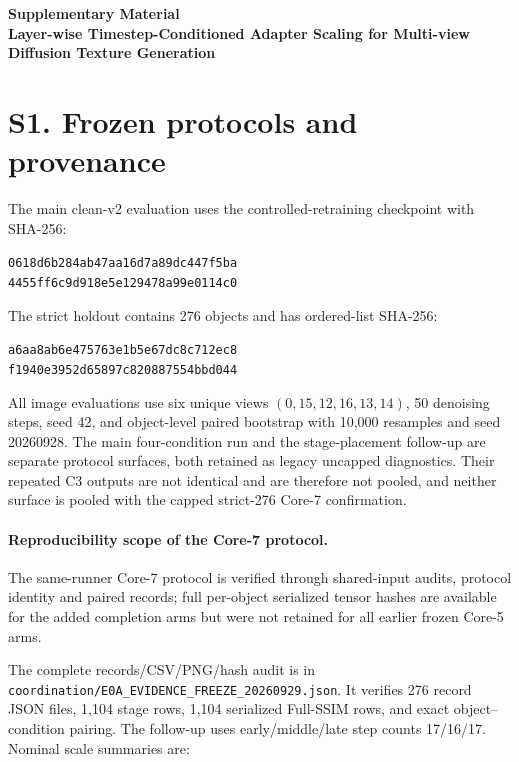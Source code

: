 \documentclass[10pt]{article}
\begin{document}
\begin{center}
{\Large\bfseries Supplementary Material}\\[4pt]
 {\large\bfseries Layer-wise Timestep-Conditioned Adapter Scaling for Multi-view Diffusion Texture Generation}
\end{center}

\section{S1. Frozen protocols and provenance}

The main clean-v2 evaluation uses the controlled-retraining checkpoint with
SHA-256:
\begin{center}
\texttt{0618d6b284ab47aa16d7a89dc447f5ba}\\
\texttt{4455ff6c9d918e5e129478a99e0114c0}
\end{center}
The strict holdout contains 276 objects and has ordered-list SHA-256:
\begin{center}
\texttt{a6aa8ab6e475763e1b5e67dc8c712ec8}\\
\texttt{f1940e3952d65897c820887554bbd044}
\end{center}
All image evaluations use six unique views $(0,15,12,16,13,14)$, 50
denoising steps, seed 42, and object-level paired bootstrap with 10,000
resamples and seed 20260928. The main four-condition run and the
stage-placement follow-up are separate protocol surfaces, both retained as
legacy uncapped diagnostics. Their repeated C3 outputs are not identical and
are therefore not pooled, and neither surface is pooled with the capped
strict-276 Core-7 confirmation.

\paragraph{Reproducibility scope of the Core-7 protocol.} The same-runner
Core-7 protocol is verified through shared-input audits, protocol identity
and paired records; full per-object serialized tensor hashes are available
for the added completion arms but were not retained for all earlier frozen
Core-5 arms.

The complete records/CSV/PNG/hash audit is in
\texttt{coordination/E0A\_EVIDENCE\_FREEZE\_20260929.json}. It verifies 276
record JSON files, 1,104 stage rows, 1,104 serialized Full-SSIM rows, and
exact object--condition pairing. The follow-up uses early/middle/late step
counts 17/16/17. Nominal scale summaries are:
\end{document}
